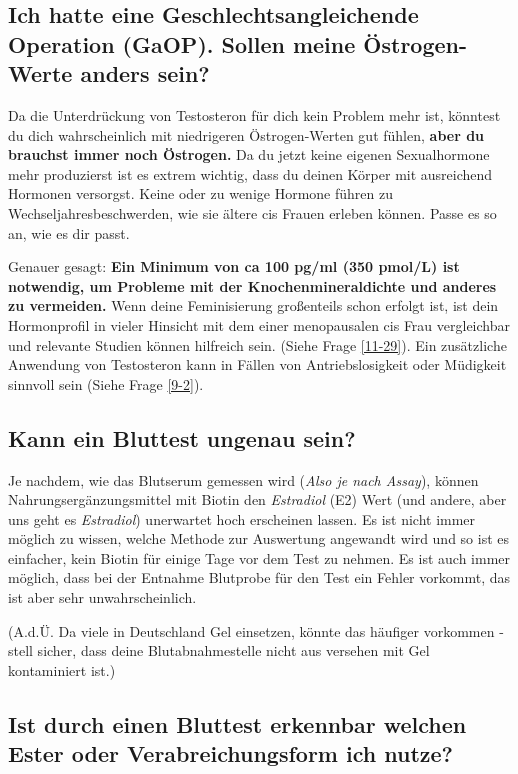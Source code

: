 \documentclass{article}
\begin{document}
\subsection{Ich hatte eine Geschlechtsangleichende Operation (GaOP). Sollen meine Östrogen-Werte anders sein?}

Da die Unterdrückung von Testosteron für dich kein Problem mehr ist, könntest du dich wahrscheinlich mit niedrigeren Östrogen-Werten gut fühlen, \textbf{aber du brauchst immer noch Östrogen.} Da du jetzt keine eigenen Sexualhormone mehr produzierst ist es extrem wichtig, dass du deinen Körper mit ausreichend Hormonen versorgst. Keine oder zu wenige Hormone führen zu Wechseljahresbeschwerden, wie sie ältere cis Frauen erleben können. Passe es so an, wie es dir passt.

Genauer gesagt: \textbf{Ein Minimum von ca 100 pg/ml (350 pmol/L) ist notwendig, um Probleme mit der Knochenmineraldichte und anderes zu vermeiden.} Wenn deine Feminisierung großenteils schon erfolgt ist, ist dein Hormonprofil in vieler Hinsicht mit dem einer menopausalen cis Frau vergleichbar und relevante Studien können hilfreich sein. (Siehe Frage \ref{11-29}). Ein zusätzliche Anwendung von Testosteron kann in Fällen von Antriebslosigkeit oder Müdigkeit sinnvoll sein (Siehe Frage \ref{9-2}).

\subsection{Kann ein Bluttest ungenau sein?}

Je nachdem, wie das Blutserum gemessen wird (\textit{Also je nach Assay}), können Nahrungsergänzungsmittel mit Biotin den \textit{Estradiol} (E2) Wert (und andere, aber uns geht es \textit{Estradiol}) unerwartet hoch erscheinen lassen. Es ist nicht immer möglich zu wissen, welche Methode zur Auswertung angewandt wird und so ist es einfacher, kein Biotin für einige Tage vor dem Test zu nehmen. Es ist auch immer möglich, dass bei der Entnahme Blutprobe für den Test ein Fehler vorkommt, das ist aber sehr unwahrscheinlich.

(A.d.Ü. Da viele in Deutschland Gel einsetzen, könnte das häufiger vorkommen - stell sicher, dass deine Blutabnahmestelle nicht aus versehen mit Gel kontaminiert ist.)

\subsection{Ist durch einen Bluttest erkennbar welchen Ester oder Verabreichungsform ich nutze?}\label{4-16}
\end{document}
